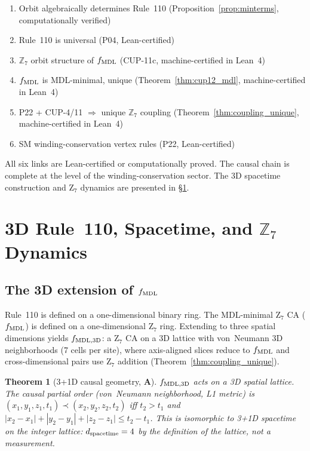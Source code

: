 \documentclass[11pt]{article}
\newtheorem{theorem}{Theorem}[section]
\theoremstyle{remark}
\newcommand{\CatA}{\textbf{A}}
\begin{document}
\begin{enumerate}
\item Orbit algebraically determines Rule~110 (Proposition~\ref{prop:minterms}, computationally verified)
\item Rule~110 is universal (P04, Lean-certified)
\item $\mathbb{Z}_7$ orbit structure of $f_{\rm MDL}$ (CUP-11c, machine-certified in Lean~4)
\item $f_{\rm MDL}$ is MDL-minimal, unique (Theorem~\ref{thm:cup12_mdl}, machine-certified in Lean~4)
\item P22 + CUP-4/11 $\Rightarrow$ unique $\mathbb{Z}_7$ coupling (Theorem~\ref{thm:coupling_unique}, machine-certified in Lean~4)
\item SM winding-conservation vertex rules (P22, Lean-certified)
\end{enumerate}

All six links are Lean-certified or computationally proved. The causal chain is complete
at the level of the winding-conservation sector. The 3D spacetime construction and Z$_7$
dynamics are presented in \S\ref{sec:cup3d}.

\section{3D Rule~110, Spacetime, and $\mathbb{Z}_7$ Dynamics}
\label{sec:cup3d}

\subsection{The 3D extension of $f_{\rm MDL}$}

Rule~110 is defined on a one-dimensional binary ring. The MDL-minimal Z$_7$ CA
($f_{\rm MDL}$) is defined on a one-dimensional Z$_7$ ring. Extending to three spatial
dimensions yields $f_{\rm MDL, 3D}$: a Z$_7$ CA on a 3D lattice with von~Neumann
3D neighborhoods (7 cells per site), where axis-aligned slices reduce to $f_{\rm MDL}$
and cross-dimensional pairs use Z$_7$ addition (Theorem~\ref{thm:coupling_unique}).

\begin{theorem}[3+1D causal geometry, $\CatA$]
\label{thm:causal_dim}
$f_{\rm MDL, 3D}$ acts on a 3D spatial lattice. The causal partial order (von~Neumann
neighborhood, L1 metric) is $(x_1, y_1, z_1, t_1) \prec (x_2, y_2, z_2, t_2)$ iff
$t_2 > t_1$ and $|x_2 - x_1| + |y_2 - y_1| + |z_2 - z_1| \leq t_2 - t_1$.
This is isomorphic to 3+1D spacetime on the integer lattice: $d_{\rm spacetime} = 4$
by the definition of the lattice, not a measurement.
\end{theorem}
\end{document}
